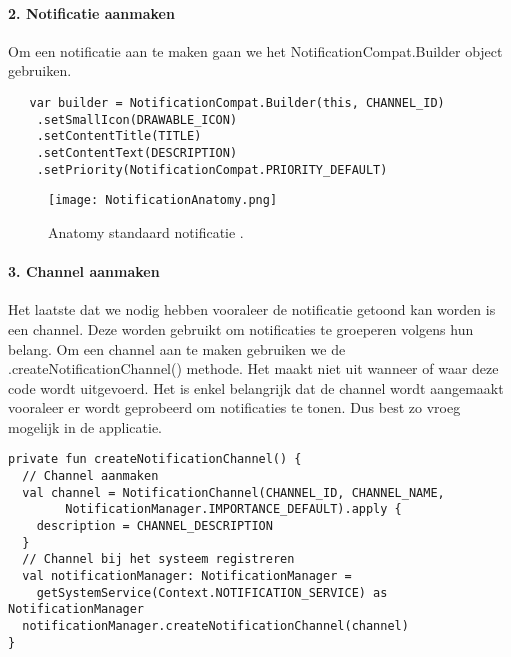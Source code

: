 \paragraph{2. Notificatie aanmaken}
Om een notificatie aan te maken gaan we het NotificationCompat.Builder object gebruiken. 
\begin{verbatim}
   var builder = NotificationCompat.Builder(this, CHANNEL_ID)
    .setSmallIcon(DRAWABLE_ICON)
    .setContentTitle(TITLE)
    .setContentText(DESCRIPTION)
    .setPriority(NotificationCompat.PRIORITY_DEFAULT)
\end{verbatim}
\begin{figure}[H]
    \centering
    \texttt{[image: NotificationAnatomy.png]}
    \caption{Anatomy standaard notificatie .}%
\end{figure}

\paragraph{3. Channel aanmaken}
Het laatste dat we nodig hebben vooraleer de notificatie getoond kan worden is een channel. Deze worden 
gebruikt om notificaties te groeperen volgens hun belang. Om een channel aan te maken gebruiken we 
de .createNotificationChannel() methode. Het maakt niet uit wanneer of waar deze code wordt uitgevoerd. 
Het is enkel belangrijk dat de channel wordt aangemaakt vooraleer er wordt geprobeerd om notificaties 
te tonen. Dus best zo vroeg mogelijk in de applicatie.
\begin{verbatim}
private fun createNotificationChannel() {
  // Channel aanmaken
  val channel = NotificationChannel(CHANNEL_ID, CHANNEL_NAME, 
        NotificationManager.IMPORTANCE_DEFAULT).apply {
    description = CHANNEL_DESCRIPTION
  }
  // Channel bij het systeem registreren
  val notificationManager: NotificationManager =
    getSystemService(Context.NOTIFICATION_SERVICE) as NotificationManager
  notificationManager.createNotificationChannel(channel)
}
\end{verbatim}

